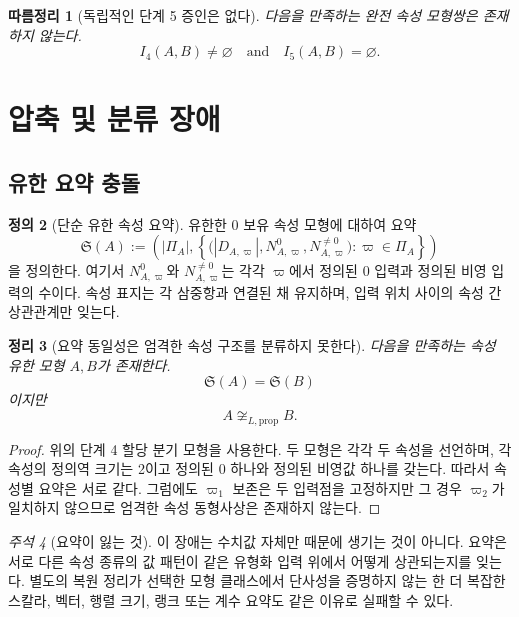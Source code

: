 \documentclass[11pt]{article}
\newtheorem{theorem}{정리}[section]
\newtheorem{corollary}[theorem]{따름정리}
\theoremstyle{definition}
\newtheorem{definition}[theorem]{정의}
\theoremstyle{remark}
\newtheorem{remark}[theorem]{주석}
\begin{document}
\begin{corollary}[독립적인 단계 5 증인은 없다]
다음을 만족하는 완전 속성 모형쌍은 존재하지 않는다.
\[
I_4(A,B)\neq\varnothing
\quad\text{and}\quad
I_5(A,B)=\varnothing.
\]
\end{corollary}

\section{압축 및 분류 장애}
\label{sec:compression}

\subsection{유한 요약 충돌}

\begin{definition}[단순 유한 속성 요약]
유한한 0 보유 속성 모형에 대하여 요약
\[
\mathfrak S(A):=
\left(
|\Pi_A|,
\left\{
\bigl(|D_{A,\varpi}|,N^0_{A,\varpi},N^{\neq0}_{A,\varpi}\bigr)
:\varpi\in\Pi_A
\right\}
\right)
\]
을 정의한다.
여기서 \(N^0_{A,\varpi}\)와 \(N^{\neq0}_{A,\varpi}\)는 각각 \(\varpi\)에서 정의된 0 입력과 정의된 비영 입력의 수이다.
속성 표지는 각 삼중항과 연결된 채 유지하며, 입력 위치 사이의 속성 간 상관관계만 잊는다.
\end{definition}

\begin{theorem}[요약 동일성은 엄격한 속성 구조를 분류하지 못한다]
\label{thm:compression}
다음을 만족하는 속성 유한 모형 \(A,B\)가 존재한다.
\[
\mathfrak S(A)=\mathfrak S(B)
\]
이지만
\[
A\not\cong_{L,\mathrm{prop}}B.
\]
\end{theorem}

\begin{proof}
위의 단계 4 할당 분기 모형을 사용한다.
두 모형은 각각 두 속성을 선언하며, 각 속성의 정의역 크기는 2이고 정의된 0 하나와 정의된 비영값 하나를 갖는다.
따라서 속성별 요약은 서로 같다.
그럼에도 \(\varpi_1\) 보존은 두 입력점을 고정하지만 그 경우 \(\varpi_2\)가 일치하지 않으므로 엄격한 속성 동형사상은 존재하지 않는다.
\end{proof}

\begin{remark}[요약이 잃는 것]
이 장애는 수치값 자체만 때문에 생기는 것이 아니다.
요약은 서로 다른 속성 종류의 값 패턴이 같은 유형화 입력 위에서 어떻게 상관되는지를 잊는다.
별도의 복원 정리가 선택한 모형 클래스에서 단사성을 증명하지 않는 한 더 복잡한 스칼라, 벡터, 행렬 크기, 랭크 또는 계수 요약도 같은 이유로 실패할 수 있다.
\end{remark}
\end{document}
